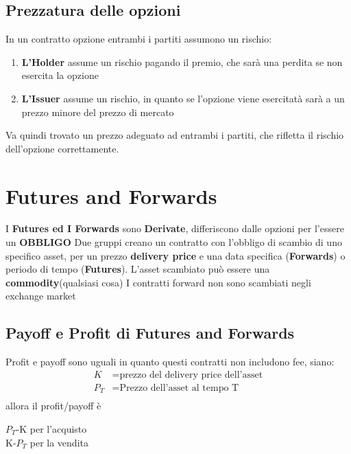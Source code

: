 \documentclass[a4paper,11pt]{report}
\begin{document}
{\subsection{Prezzatura delle opzioni}
	In un contratto opzione entrambi i partiti assumono un rischio:
\begin{enumerate}
	\item \textbf{L'Holder} assume un rischio pagando il premio, che sarà una perdita se non esercita la opzione
	\item \textbf{L'Issuer} assume un rischio, in quanto se l'opzione viene esercitatà sarà a un prezzo minore del prezzo di 	mercato
\end{enumerate}
 	Va quindi trovato un prezzo adeguato ad entrambi i partiti, che rifletta il rischio dell'opzione correttamente.
\newpage

\section{Futures and Forwards}
	I \textbf{Futures ed I Forwards} sono \textbf{Derivate}, differiscono dalle opzioni per l'essere un \textbf{OBBLIGO} \newline
	Due gruppi creano un contratto con l'obbligo di scambio di uno specifico asset, per un prezzo \textbf{delivery price} e una 		data specifica (\textbf{Forwards}) o periodo di tempo (\textbf{Futures}). \newline
	L'asset scambiato può essere una \textbf{commodity}(qualsiasi cosa) \newline
	I contratti forward non sono scambiati negli exchange market
\subsection{Payoff e Profit di Futures and Forwards}
	Profit e payoff sono uguali in quanto questi contratti non includono fee, \newline
	siano:
\begin{align*}
	K &= \text{prezzo del delivery price dell'asset}\\
	\text{$P_T$} &= \text{Prezzo dell'asset al tempo T} \\
\end{align*}
	allora il profit/payoff è
\begin{center}
	$P_T$-K  {\small{per l'acquisto}} \\
	K-$P_T$ {\small{per la vendita}}
\end{center}
\newpage

}
\end{document}
